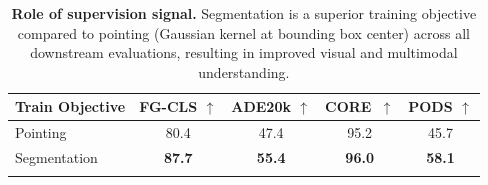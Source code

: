 \begin{table}[t]
\centering
\footnotesize
\setlength{\tabcolsep}{6pt}
\begin{threeparttable}
\caption{%
\textbf{Role of supervision signal.} 
Segmentation is a superior training objective compared to pointing (Gaussian kernel at bounding box center) across all downstream evaluations, resulting in improved visual and multimodal understanding.
}
\label{tab:supervision}
\begin{tabular}{@{} l
                S[table-format=2.1]
                S[table-format=2.1]
                S[table-format=2.1]
                S[table-format=2.1]@{}}
\toprule
{Train Objective}
  & {FG-CLS $\uparrow$}
  & {ADE20k $\uparrow$}
  & {CORE\ $\uparrow$}
  & {PODS $\uparrow$} \\
\midrule
Pointing & {80.4} & {47.4} & {95.2} & {45.7} \\
\rowcolor{\methodcolor}
Segmentation & \textbf{87.7}  & \textbf{{55.4}} & \textbf{96.0} & \textbf{58.1} \\
\rowcolor{\methodcolor}
\bottomrule
\end{tabular}
\end{threeparttable}
\end{table}




